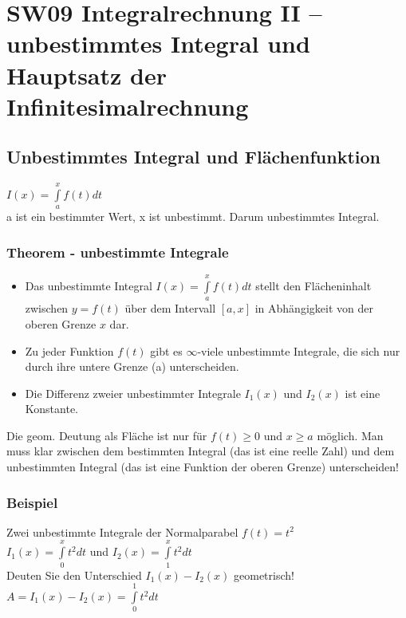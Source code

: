 \documentclass[../main.tex]{subfiles}
\begin{document}

\chapter{SW09 Integralrechnung II -- unbestimmtes Integral und Hauptsatz der Infinitesimalrechnung}
\section{Unbestimmtes Integral und Flächenfunktion}
$I(x) = \int\limits_a^x f(t)dt$ \\
a ist ein bestimmter Wert, x ist unbestimmt. Darum unbestimmtes Integral.

\subsection{Theorem - unbestimmte Integrale}
\begin{itemize}
    \item Das unbestimmte Integral $I(x) = \int\limits_a^x f(t)dt$ stellt den Flächeninhalt zwischen
    $y=f(t)$ über dem Intervall $[a,x]$ in Abhängigkeit von der oberen Grenze $x$ dar.
    \item Zu jeder Funktion $f(t)$ gibt es $\infty$-viele unbestimmte Integrale, die sich nur
    durch ihre untere Grenze (a) unterscheiden.
    \item Die Differenz zweier unbestimmter Integrale $I_1(x)$ und $I_2(x)$ ist eine Konstante.
\end{itemize}
Die geom. Deutung als Fläche ist nur für $f(t)\geq 0$ und $x \geq a$ möglich. Man muss klar zwischen dem 
bestimmten Integral (das ist eine reelle Zahl) und dem unbestimmten Integral (das ist eine Funktion
der oberen Grenze) unterscheiden!

\subsection{Beispiel}
Zwei unbestimmte Integrale der Normalparabel $f(t)=t^2$ \\
$I_1(x)=\int\limits_0^x t^2dt$ und $I_2(x)=\int\limits_1^x t^2dt$ \\[7pt]
Deuten Sie den Unterschied $I_1(x) - I_2(x)$ geometrisch! \\
$A = I_1(x) - I_2(x) = \int\limits_0^1 t^2dt$
\end{document}

